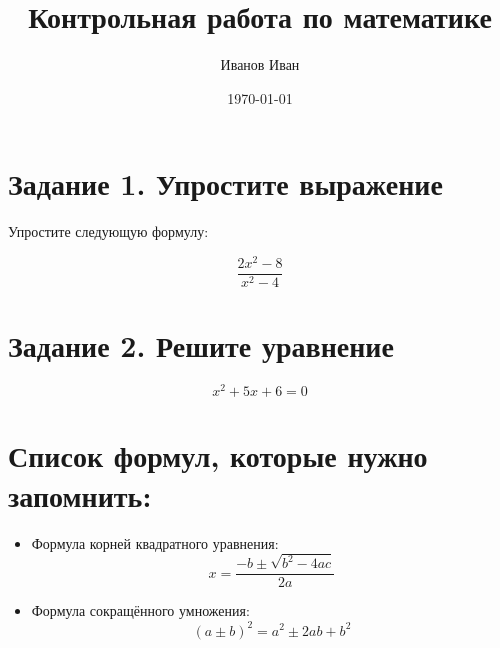\documentclass[12pt]{article}
\title{Контрольная работа по математике}
\author{Иванов Иван}
\date{\today}
\begin{document}
\maketitle

\section*{Задание 1. Упростите выражение}

Упростите следующую формулу:

\[
\frac{2x^2 - 8}{x^2 - 4}
\]

\section*{Задание 2. Решите уравнение}

\[
x^2 + 5x + 6 = 0
\]

\section*{Список формул, которые нужно запомнить:}

\begin{itemize}
  \item Формула корней квадратного уравнения:
  \[
  x = \frac{-b \pm \sqrt{b^2 - 4ac}}{2a}
  \]
  \item Формула сокращённого умножения:
  \[
  (a \pm b)^2 = a^2 \pm 2ab + b^2
  \]
\end{itemize}
\end{document}
